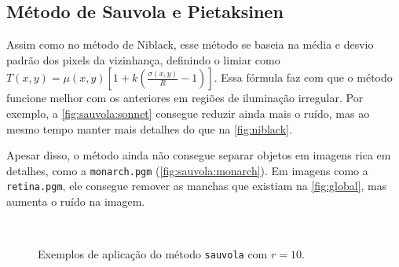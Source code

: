\subsection{Método de Sauvola e Pietaksinen}

Assim como no método de Niblack, esse método se baseia na média e desvio padrão dos pixels da vizinhança, definindo o limiar como $T(x, y) = \mu(x, y) \left[1 + k \left(\frac{\sigma(x, y)}{R} - 1\right)\right]$. Essa fórmula faz com que o método funcione melhor com os anteriores em regiões de iluminação irregular. Por exemplo, a \cref{fig:sauvola:sonnet} consegue reduzir ainda mais o ruído, mas ao mesmo tempo manter mais detalhes do que na \cref{fig:niblack}.

Apesar disso, o método ainda não consegue separar objetos em imagens rica em detalhes, como a \texttt{monarch.pgm} (\cref{fig:sauvola:monarch}). Em imagens como a \texttt{retina.pgm}, ele consegue remover as manchas que existiam na \cref{fig:global}, mas aumenta o ruído na imagem.

\begin{figure}[H]
    \centering
    \\[8pt]

    \caption{Exemplos de aplicação do método \texttt{sauvola} com $r = 10$.}
    \label{fig:sauvola}
\end{figure}